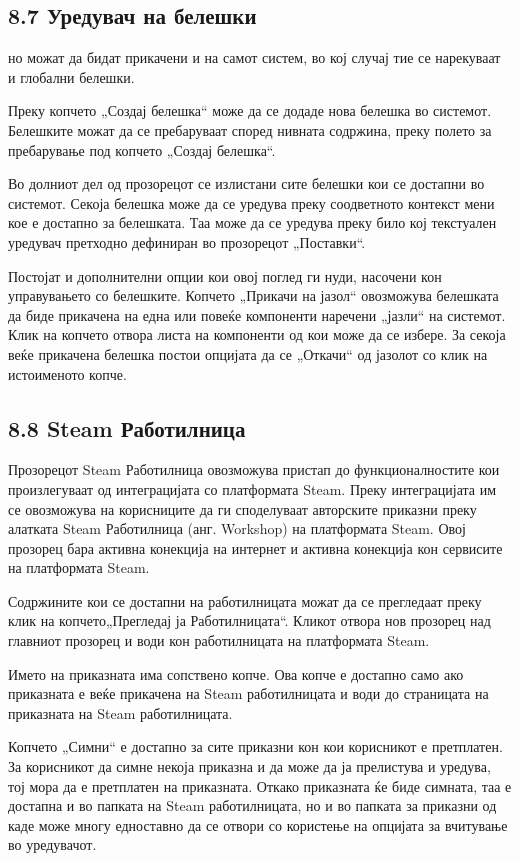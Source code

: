 \subsection{8.7 Уредувач на белешки}


но можат да бидат прикачени и на самот систем, во кој случај тие се нарекуваат и глобални белешки.

Преку копчето „Создај белешка“ може да се додаде нова белешка во системот. Белешките можат да се пребаруваат според нивната содржина, преку полето за пребарување под копчето „Создај белешка“.

Во долниот дел од прозорецот се излистани сите белешки кои се достапни во системот. Секоја белешка може да се уредува преку соодветното контекст мени кое е достапно за белешката. Таа може да се уредува преку било кој текстуален уредувач претходно дефиниран во прозорецот „Поставки“.

Постојат и дополнителни опции кои овој поглед ги нуди, насочени кон управувањето со белешките. Копчето „Прикачи на јазол“ овозможува белешката да биде прикачена на една или повеќе компоненти наречени „јазли“ на системот. Клик на копчето отвора листа на компоненти од кои може да се избере. За секоја веќе прикачена белешка постои опцијата да се „Откачи“ од јазолот со клик на истоименото копче.

\subsection{8.8 Steam Работилница}

Прозорецот Steam Работилница овозможува пристап до функционалностите кои произлегуваат од интеграцијата со платформата Steam. Преку интеграцијата им се овозможува на корисниците да ги споделуваат авторските приказни преку алатката Steam Работилница (анг. Workshop) на платформата Steam. Овој прозорец бара активна конекција на интернет и активна конекција кон сервисите на платформата Steam.

Содржините кои се достапни на работилницата можат да се прегледаат преку клик на копчето„Прегледај ја Работилницата“. Кликот отвора нов прозорец над главниот прозорец и води кон работилницата на платформата Steam.

Името на приказната има сопствено копче. Ова копче е достапно само ако приказната е веќе прикачена на Steam работилницата и води до страницата на приказната на Steam работилницата.


Копчето „Симни“ е достапно за сите приказни кон кои корисникот е претплатен. За корисникот да симне некоја приказна и да може да ја прелистува и уредува, тој мора да е претплатен на приказната. Откако приказната ќе биде симната, таа е достапна и во папката на Steam работилницата, но и во папката за приказни од каде може многу едноставно да се отвори со користење на опцијата за вчитување во уредувачот.

